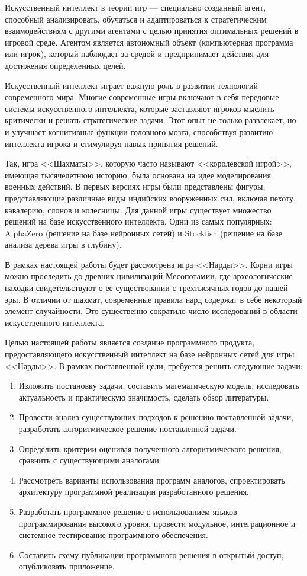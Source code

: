 Искусственный интеллект в теории игр --- специально созданный агент, способный анализировать, обучаться и адаптироваться к стратегическим взаимодействиям с другими агентами с целью принятия оптимальных решений в игровой среде. Агентом является автономный объект (компьютерная программа или игрок), который наблюдает за средой и предпринимает действия для достижения определенных целей.

Искусственный интеллект играет важную роль в развитии технологий современного мира. Многие современные игры включают в себя передовые системы искусственного интеллекта, которые заставляют игроков мыслить критически и решать стратегические задачи. Этот опыт не только развлекает, но и улучшает когнитивные функции головного мозга, способствуя развитию интеллекта игрока и стимулируя навык принятия решений.

Так, игра <<Шахматы>>, которую часто называют <<королевской игрой>>, имеющая тысячелетнюю историю, была основана на идее моделирования военных действий. В первых версиях игры были представлены фигуры, представляющие различные виды индийских вооруженных сил, включая пехоту, кавалерию, слонов и колесницы. Для данной игры существует множество решений на базе искусственного интеллекта. Одни из самых популярных: AlphaZero (решение на базе нейронных сетей) и Stockfish (решение на базе анализа дерева игры в глубину).

В рамках настоящей работы будет рассмотрена игра <<Нарды>>. Корни игры можно проследить до древних цивилизаций Месопотамии, где археологические находки свидетельствуют о ее существовании с трехтысячных годов до нашей эры. В отличии от шахмат, современные правила нард содержат в себе некоторый элемент случайности. Это существенно сократило число исследований в области искусственного интеллекта.

Целью настоящей работы является создание программного продукта, предоставляющего искусственный интеллект на базе нейронных сетей для игры <<Нарды>>. В рамках поставленной цели, требуется решить следующие задачи:
\begin{enumerate}
    \item Изложить постановку задачи, составить математическую модель, исследовать актуальность и практическую значимость, сделать обзор литературы.
    \item Провести анализ существующих подходов к решению поставленной задачи, разработать алгоритмическое решение поставленной задачи.
    \item Определить критерии оценивая полученного алгоритмического решения, сравнить с существующими аналогами.
    \item Рассмотреть варианты использования программ аналогов, спроектировать архитектуру программной реализации разработанного решения.
    \item Разработать программное решение с использованием языков программирования высокого уровня, провести модульное, интеграционное и системное тестирование программного обеспечения.
    \item Составить схему публикации программного решения в открытый доступ, опубликовать приложение.
\end{enumerate}
